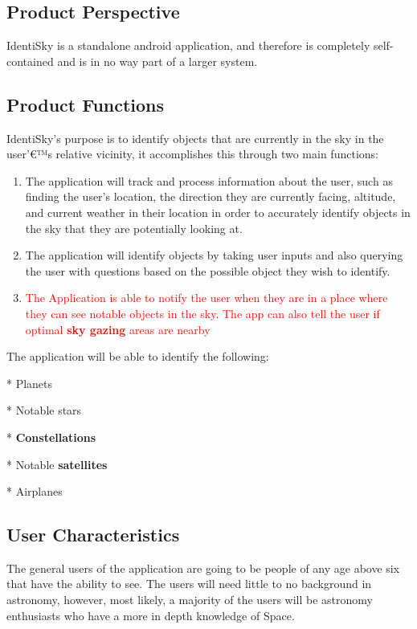 \documentclass[]{article}
\begin{document}
\subsection{Product Perspective}
\label{sub:product_perspective}
IdentiSky is a standalone android application, and therefore is completely self-contained and is in no way part of a larger system. 

\subsection{Product Functions}
\label{sub:product_functions}
IdentiSky's purpose is to identify objects that are currently in the sky in the user'€™s relative vicinity, it accomplishes this through two main functions: 
\begin{enumerate}
\item The application will track and process information about the user, such as finding the user's location, the direction they are currently facing, altitude, and current weather in their location in order to accurately identify objects in the sky that they are potentially looking at.

\item The application will identify objects by taking user inputs and also querying the user with questions based on the possible object they wish to identify.


\item \textcolor{red}{The Application is able to notify the user when they are in a place where they can see notable objects in the sky. The app can also tell the user if optimal \textbf{sky gazing} areas are nearby}
\end{enumerate}

The application will be able to identify the following:

* Planets

* Notable stars

* \textbf{Constellations}

* Notable \textbf{satellites}

* Airplanes 

\subsection{User Characteristics}
\label{sub:user_characteristics}
The general users of the application are going to be people of any age above six that have the ability to see. The users will need little to no background in astronomy, however, most likely, a majority of the users will be astronomy enthusiasts who have a more in depth knowledge of Space. 
\end{document}
